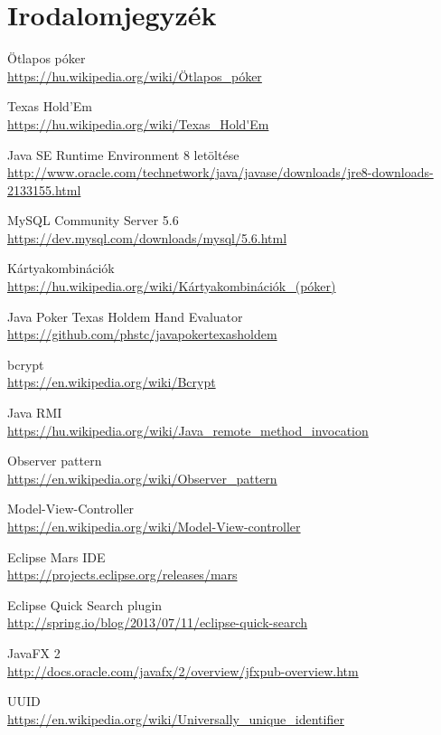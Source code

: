 \part{Irodalomjegyzék}

\begin{thebibliography}{9}

Ötlapos póker \\
\url{https://hu.wikipedia.org/wiki/Ötlapos_póker}

Texas Hold'Em \\
\url{https://hu.wikipedia.org/wiki/Texas_Hold'Em}

Java SE Runtime Environment 8 letöltése \\
\url{http://www.oracle.com/technetwork/java/javase/downloads/jre8-downloads-2133155.html}

MySQL Community Server 5.6 \\
\url{https://dev.mysql.com/downloads/mysql/5.6.html}

Kártyakombinációk \\
\url{https://hu.wikipedia.org/wiki/Kártyakombinációk_(póker)}

Java Poker Texas Holdem Hand Evaluator \\
\url{https://github.com/phstc/javapokertexasholdem}

bcrypt \\
\url{https://en.wikipedia.org/wiki/Bcrypt}

Java RMI \\
\url{https://hu.wikipedia.org/wiki/Java_remote_method_invocation}

Observer pattern \\
\url{https://en.wikipedia.org/wiki/Observer_pattern}

Model-View-Controller \\
\url{https://en.wikipedia.org/wiki/Model-View-controller}

Eclipse Mars IDE \\
\url{https://projects.eclipse.org/releases/mars}

Eclipse Quick Search plugin \\
\url{http://spring.io/blog/2013/07/11/eclipse-quick-search}

JavaFX 2 \\
\url{http://docs.oracle.com/javafx/2/overview/jfxpub-overview.htm}

UUID \\
\url{https://en.wikipedia.org/wiki/Universally_unique_identifier}



\end{thebibliography}
